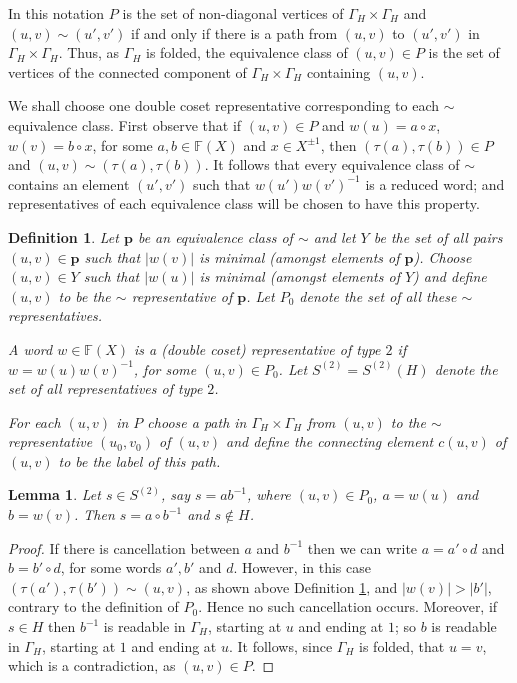 \documentclass[a4paper,12pt]{article}
\newcommand{\G}{\Gamma }
\renewcommand{\t}{\tau }
\newcommand{\pp}{\mathbf{p}}
\newtheorem{lemma}[theorem]{Lemma}
\newtheorem{definition}[theorem]{Definition}
\numberwithin{equation}{section}
\numberwithin{figure}{section}
\newcommand{\FF}{\ensuremath{\mathbb{F}}}
\begin{document}
In this notation $P$ is the set of non-diagonal vertices of
$\G_H\times \G_H$ and $(u,v)\sim (u',v')$ if and only if there is
a path from $(u,v)$ to $(u',v')$ in $\G_H\times \G_H$.
 Thus, as $\G_H$ is folded, the equivalence class of $(u,v)\in P$
is the set of vertices of the connected component of $\G_H\times \G_H$
containing $(u,v)$.

We shall choose one double coset representative corresponding to
each $\sim$ equivalence class. First observe that if
$(u,v)\in P$ and $w(u)=a\circ x$, $w(v)=b\circ x$, for some
$a,b\in \FF(X)$ and $x\in X^{\pm 1}$, then $(\t(a),\t(b))\in P$ and
$(u,v)\sim (\t(a),\t(b))$. It follows that every equivalence  class
of $\sim$ contains an element $(u',v')$ such that
$w(u')w(v')^{-1}$ is a reduced word; and representatives of each
equivalence class will be chosen to have this property.

\begin{definition}\label{def:repres_t2}
Let $\pp$ be an equivalence class of $\sim$ and let $Y$ be the set
of all pairs $(u,v)\in \pp$ such that $|w(v)|$ is minimal (amongst
elements of $\pp$). Choose $(u,v)\in Y$ such that $|w(u)|$ is
minimal (amongst elements of $Y$) and define $(u,v)$ to be the
$\sim$ {\em representative} of
$\pp$. %
Let $P_0$ denote the set of  all these $\sim$
representatives.

A word $w\in \FF(X)$ is
 a {\em (double coset) representative of type} $2$
if $w=w(u)w(v)^{-1}$, for some $(u,v)\in P_0$.
Let $S^{(2)}=S^{(2)}(H)$ denote the set of all representatives of type $2$.

For each $(u,v)$ in $P$ choose a path in $\G_H\times \G_H$
from $(u,v)$ to the $\sim$ representative
$(u_0,v_0)$ of $(u,v)$ and define the {\em connecting element}
$c(u,v)$  of $(u,v)$ to be the label of this path.
\end{definition}

\begin{lemma}\label{lem:rep2}
Let $s\in S^{(2)}$, say $s=ab^{-1}$, where $(u,v)\in P_0$, 
$a=w(u)$ and $b=w(v)$. Then
$s=a\circ b^{-1}$ and $s\notin H$.
\end{lemma}
\begin{proof}
If there is cancellation between $a$ and $b^{-1}$ then we can
 write $a=a'\circ d$ and $b=b'\circ d$, for some words $a',b'$ and $d$. 
However, in this case $(\t(a'),\t(b'))\sim (u,v)$, as shown above
Definition \ref{def:repres_t2}, and $|w(v)|>|b'|$, contrary to the
definition of $P_0$. Hence no such cancellation occurs. Moreover, 
if $s\in H$ then $b^{-1}$ is readable in $\G_H$, starting at $u$ 
and ending at $1$; so
$b$ is readable in $\G_H$, starting at $1$ and ending at $u$. It
follows, since $\G_H$ is folded, that $u=v$, which is a contradiction, 
as $(u,v)\in P$.  
\end{proof}
\end{document}
